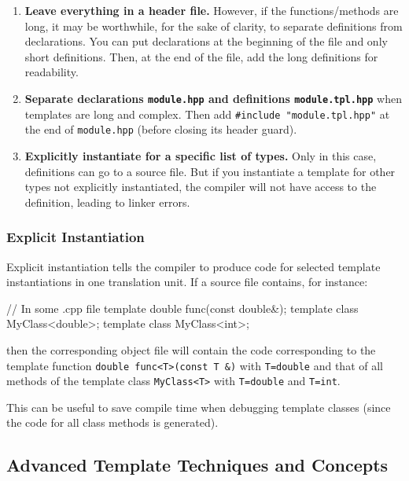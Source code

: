 \begin{enumerate}
    \item \textbf{Leave everything in a header file.} However, if the functions/methods are long, it may be worthwhile, for the sake of clarity, to separate definitions from declarations. You can put declarations at the beginning of the file and only short definitions. Then, at the end of the file, add the long definitions for readability.
    
    \item \textbf{Separate declarations \texttt{module.hpp} and definitions \texttt{module.tpl.hpp}} when templates are long and complex. Then add \texttt{\#include "module.tpl.hpp"} at the end of \texttt{module.hpp} (before closing its header guard).

    \item \textbf{Explicitly instantiate for a specific list of types.} Only in this case, definitions can go to a source file. But if you instantiate a template for other types not explicitly instantiated, the compiler will not have access to the definition, leading to linker errors.
\end{enumerate}

\subsubsection{Explicit Instantiation}

Explicit instantiation tells the compiler to produce code for selected template instantiations in one translation unit. If a source file contains, for instance:

\begin{codeblock}[language=C++, numbers=none]
// In some .cpp file
template double func(const double&);
template class MyClass<double>;
template class MyClass<int>;
\end{codeblock}

then the corresponding object file will contain the code corresponding to the template function \texttt{double func<T>(const T \&)} with \texttt{T=double} and that of all methods of the template class \texttt{MyClass<T>} with \texttt{T=double} and \texttt{T=int}.

\vspace{ 0.5em}

This can be useful to save compile time when debugging template classes (since the code for all class methods is generated).

\subsection{Advanced Template Techniques and Concepts}

